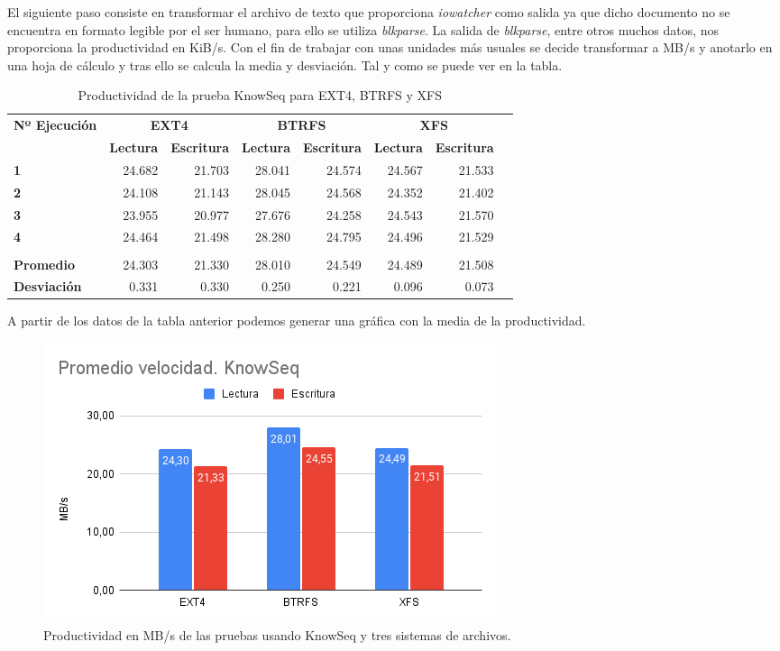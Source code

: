 El siguiente paso consiste en transformar el archivo de texto que proporciona \textit{iowatcher} como salida ya que dicho documento no se encuentra en formato legible por el ser humano, para ello se utiliza \textit{blkparse}. La salida de \textit{blkparse}, entre otros muchos datos, nos proporciona la productividad en KiB/s. Con el fin de trabajar con unas unidades más usuales se decide transformar a MB/s y anotarlo en una hoja de cálculo y tras ello se calcula la media y desviación. Tal y como se puede ver en la tabla.

\begin{table}[H]\centering
\caption{Productividad de la prueba KnowSeq para EXT4, BTRFS y XFS}\label{tab: }
\scriptsize
\begin{tabular}{lrrrrrrr}\toprule
\textbf{Nº Ejecución} &\multicolumn{2}{c}{\textbf{EXT4}} &\multicolumn{2}{c}{\textbf{BTRFS}} &\multicolumn{2}{c}{\textbf{XFS}} \\\cmidrule{1-7}
&\textbf{Lectura} &\textbf{Escritura} &\textbf{Lectura} &\textbf{Escritura} &\textbf{Lectura} &\textbf{Escritura} \\\midrule
\textbf{1} &24.682 &21.703 &28.041 &24.574 &24.567 &21.533 \\
\textbf{2} &24.108 &21.143 &28.045 &24.568 &24.352 &21.402 \\
\textbf{3} &23.955 &20.977 &27.676 &24.258 &24.543 &21.570 \\
\textbf{4} &24.464 &21.498 &28.280 &24.795 &24.496 &21.529 \\
\textbf{} & & & & & & \\
\textbf{Promedio} &24.303 &21.330 &28.010 &24.549 &24.489 &21.508 \\
\textbf{Desviación} &0.331 &0.330 &0.250 &0.221 &0.096 &0.073 \\
\bottomrule
\end{tabular}
\end{table}
A partir de los datos de la tabla anterior podemos generar una gráfica con la media de la productividad.

\begin{figure}[H]
    \centering
    \includegraphics[scale=0.6]{doc/assets/images/Capitulo4/Knowseq/promknow.png}
    \caption{Productividad en MB/s de las pruebas usando KnowSeq y tres sistemas de archivos.}
    \label{aa}
\end{figure}

